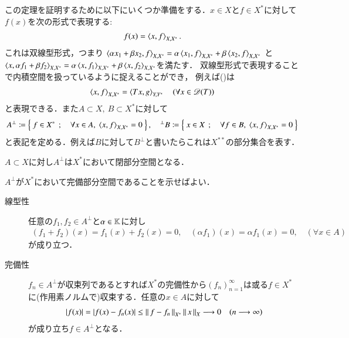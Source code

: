 	この定理を証明するために以下にいくつか準備をする．$x \in X$と$f \in X^*$に対して$f(x)$を次の形式で表現する:
	\begin{align}
		f(x) = \inprod<x,f>_{X,X^*}.
	\end{align}
	これは双線型形式，つまり
	$\inprod<\alpha x_1 + \beta x_2,f>_{X,X^*} = \alpha \inprod<x_1,f>_{X,X^*} + \beta\inprod<x_2,f>_{X,X^*}$
	と$\inprod<x,\alpha f_1 + \beta f_2>_{X,X^*} = \alpha \inprod<x,f_1>_{X,X^*} + \beta\inprod<x,f_2>_{X,X^*}$を満たす．
	双線型形式で表現することで内積空間を扱っているように捉えることができ，
	例えば()は
	\begin{align}
		\inprod<x,f>_{X,X^*} = \inprod<Tx,g>_{Y,Y^*} \quad (\forall x \in \mathscr{D}(T))
	\end{align}
	と表現できる．また$A \subset X,\ B \subset X^*$に対して
	\begin{align}
		A^{\perp} \coloneqq \Set{f \in X^*}{\forall x \in A,\ \inprod<x,f>_{X,X^*} = 0}, \quad 
		{}^{\perp}B \coloneqq \Set{x \in X}{\forall f \in B,\ \inprod<x,f>_{X,X^*} = 0}
	\end{align}
	と表記を定める．例えば$B$に対して$B^{\perp}$と書いたらこれは$X^{**}$の部分集合を表す．
	
	\begin{screen}
		\begin{lem}
			$A \subset X$に対し$A^{\perp}$は$X^*$において閉部分空間となる．
			\label{lem:T_star_closed_1}
		\end{lem}
	\end{screen}
	
	\begin{prf}
		$A^{\perp}$が$X^*$において完備部分空間であることを示せばよい．
		\begin{description}
			\item[線型性]
				任意の$f_1,f_2 \in A^{\perp}$と$\alpha \in \mathbb{K}$に対し
				\begin{align}
					(f_1 + f_2)(x) = f_1(x) + f_2(x) = 0, \quad (\alpha f_1)(x) = \alpha f_1(x) = 0
					,\quad (\forall x \in A)
				\end{align}
				が成り立つ．
				
			\item[完備性]
				$f_n \in A^{\perp}$が収束列であるとすれば$X^*$の完備性から$(f_n)_{n=1}^{\infty}$は或る$f \in X^*$
				に(作用素ノルムで)収束する．任意の$x \in A$に対して
				\begin{align}
					|f(x)| = |f(x) - f_n(x)| \leq \left\|\, f-f_n\, \right\|_{X^*}\left\|\, x\, \right\|_{X} \longrightarrow 0 \quad (n \longrightarrow \infty)
				\end{align}
				が成り立ち$f \in A^{\perp}$となる．
		\end{description}
		\QED
	\end{prf}
	
